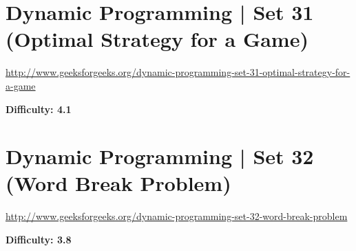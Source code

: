 
\section{Dynamic Programming | Set 31 (Optimal Strategy for a Game)
  \label{secGFGDPSet31OptStratForAGame}}

\url{http://www.geeksforgeeks.org/dynamic-programming-set-31-optimal-strategy-for-a-game}

\textbf{Difficulty: 4.1}


\textbf{}

\RayNotesBegin



\RayNotesEnd

\textbf{}


\section{Dynamic Programming | Set 32 (Word Break Problem)
  \label{secGFGDPSet32WordBreakProb}}

\url{http://www.geeksforgeeks.org/dynamic-programming-set-32-word-break-problem}

\textbf{Difficulty: 3.8}



\textbf{}

\RayNotesBegin



\RayNotesEnd

\textbf{}


